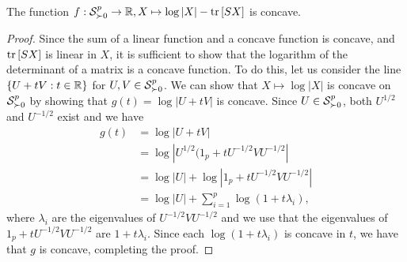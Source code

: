 \begin{lemma}
    The function $f : \S^p_{\succ 0} \rightarrow \R, X \mapsto \log |X| - \trB{SX}$ is concave.
\end{lemma}
\begin{proof}
    Since the sum of a linear function and a concave function is concave, and $\trB{SX}$ is linear in $X$, it is sufficient to show that the logarithm of the determinant of a matrix is a concave function. To do this, let us consider the line $\eset{ U + tV : t \in \R }$ for $U, V \in \S^p_{\succ 0}$. We can show that $X \mapsto \log |X|$ is concave on $\S^p_{\succ 0}$ by showing that $g(t) = \log |U + tV|$ is concave. Since $U \in \S^p_{\succ 0}$, both $U^{1/2}$ and $U^{-1/2}$ exist and we have 
    \begin{align*}
        g(t)
        &= \log |U + tV| \\
        &= \log |U^{1/2}(1_p + tU^{-1/2}VU^{-1/2}|\\
        &= \log |U| + \log |1_p + tU^{-1/2}VU^{-1/2}|\\
        &= \log |U| + \sum_{i=1}^p \log (1 + t\lambda_i),
    \end{align*}
    where $\lambda_i$ are the eigenvalues of $U^{-1/2}VU^{-1/2}$ and we use that the eigenvalues of $1_p + tU^{-1/2}VU^{-1/2}$ are $1 + t\lambda_i$. Since each $\log (1 + t\lambda_i)$ is concave in $t$, we have that $g$ is concave, completing the proof.
\end{proof}

